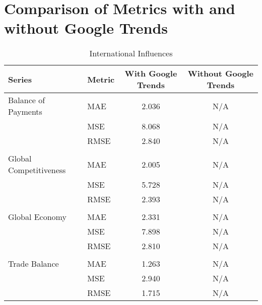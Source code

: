 \documentclass[a4paper,12pt]{article}
\begin{document}
\section*{Comparison of Metrics with and without Google Trends}

\begin{table}
\caption{International Influences}
\label{tab:metrics_comparison_International_Influences}
\begin{tabular}{llcc}
\toprule
Series & Metric & With Google Trends & Without Google Trends \\
\midrule
Balance of Payments & MAE & 2.036 & N/A \\
 & MSE & 8.068 & N/A \\
 & RMSE & 2.840 & N/A \\
\arrayrulecolor{black!30}\midrule &  &  &  \\
Global Competitiveness & MAE & 2.005 & N/A \\
 & MSE & 5.728 & N/A \\
 & RMSE & 2.393 & N/A \\
\arrayrulecolor{black!30}\midrule &  &  &  \\
Global Economy & MAE & 2.331 & N/A \\
 & MSE & 7.898 & N/A \\
 & RMSE & 2.810 & N/A \\
\arrayrulecolor{black!30}\midrule &  &  &  \\
Trade Balance & MAE & 1.263 & N/A \\
 & MSE & 2.940 & N/A \\
 & RMSE & 1.715 & N/A \\
\bottomrule
\end{tabular}
\end{table}
\end{document}
